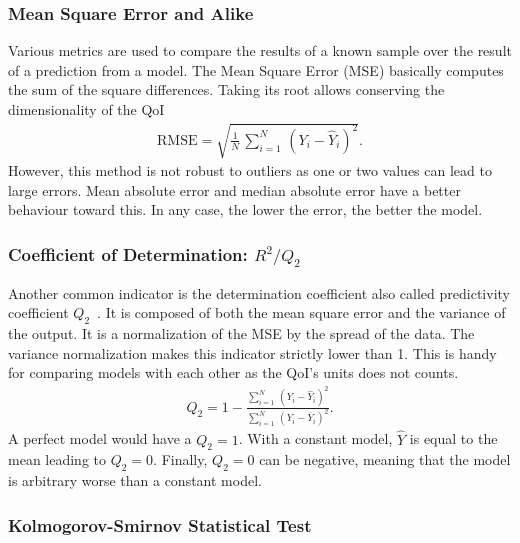 \subsubsection{Mean Square Error and Alike}
Various metrics are used to compare the results of a known sample over the result of a prediction from a model. The Mean Square Error (MSE) basically computes the sum of the square differences. Taking its root allows conserving the dimensionality of the QoI
\begin{align}
\text{RMSE} = \sqrt{\frac{1}{N}\,
\displaystyle\sum_{i = 1}^{N}\,(Y_i - \hat{Y}_{i})^2}.
\end{align}
However, this method is not robust to outliers as one or two values can lead to large errors. Mean absolute error and median absolute error have a better behaviour toward this. In any case, the lower the error, the better the model.

\subsubsection{Coefficient of Determination: $R^2/Q_2$}
Another common indicator is the determination coefficient also called predictivity coefficient $Q_2$~\citep{marrel2009}. It is composed of both the mean square error and the variance of the output. It is a normalization of the MSE by the spread of the data. The variance normalization makes this indicator strictly lower than 1. This is handy for comparing models with each other as the QoI's units does not counts.
\begin{align} 
Q_{2} = 1 - \frac{\displaystyle\sum_{i = 1}^{N}\,\left(Y_i - \widehat{Y}_i\right)^2}{\displaystyle\sum_{i = 1}^{N}\,\left(Y_{i} - \overline{Y}_i\right)^2}.
\end{align}
A perfect model would have a $Q_2=1$. With a constant model, $\hat{Y}$ is equal to the mean leading to $Q_2=0$. Finally, $Q_2=0$ can be negative, meaning that the model is arbitrary worse than a constant model.

\subsubsection{Kolmogorov-Smirnov Statistical Test}

